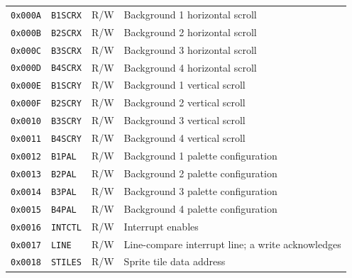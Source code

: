 \begin{table}[H]
\begin{tabular}{lllp{5.2cm}}
		\texttt{0x000A}                  & \texttt{B1SCRX}   & R/W             & Background 1 horizontal scroll                           \\
		\texttt{0x000B}                  & \texttt{B2SCRX}   & R/W             & Background 2 horizontal scroll                           \\
		\texttt{0x000C}                  & \texttt{B3SCRX}   & R/W             & Background 3 horizontal scroll                           \\
		\texttt{0x000D}                  & \texttt{B4SCRX}   & R/W             & Background 4 horizontal scroll                           \\
		\texttt{0x000E}                  & \texttt{B1SCRY}   & R/W             & Background 1 vertical scroll                             \\
		\texttt{0x000F}                  & \texttt{B2SCRY}   & R/W             & Background 2 vertical scroll                             \\
		\texttt{0x0010}                  & \texttt{B3SCRY}   & R/W             & Background 3 vertical scroll                             \\
		\texttt{0x0011}                  & \texttt{B4SCRY}   & R/W             & Background 4 vertical scroll                             \\
		\texttt{0x0012}                  & \texttt{B1PAL}    & R/W             & Background 1 palette configuration                       \\
		\texttt{0x0013}                  & \texttt{B2PAL}    & R/W             & Background 2 palette configuration                       \\
		\texttt{0x0014}                  & \texttt{B3PAL}    & R/W             & Background 3 palette configuration                       \\
		\texttt{0x0015}                  & \texttt{B4PAL}    & R/W             & Background 4 palette configuration                       \\
		\texttt{0x0016}                  & \texttt{INTCTL}   & R/W             & Interrupt enables                                        \\
		\texttt{0x0017}                  & \texttt{LINE}     & R/W             & Line-compare interrupt line; a write acknowledges        \\
		\texttt{0x0018}                  & \texttt{STILES}   & R/W             & Sprite tile data address                                 \\

\end{tabular}
\end{table}
